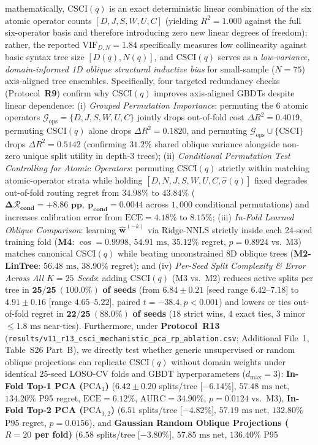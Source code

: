 \documentclass[10pt,a4paper]{article}
\begin{document}
\begin{enumerate}[leftmargin=1.5em,itemsep=0.8pt]
mathematically, $\text{CSCI}(q)$ is an exact deterministic linear combination of the six atomic operator counts $[D,J,S,W,U,C]$ (yielding $R^2=1.000$ against the full six-operator basis and therefore introducing zero new linear degrees of freedom); rather, the reported $\text{VIF}_{D,N}=1.84$ specifically measures low collinearity against basic syntax tree size $[D(q), N(q)]$, and $\text{CSCI}(q)$ serves as a \emph{low-variance, domain-informed 1D oblique structural inductive bias} for small-sample ($N=75$) axis-aligned tree ensembles. Specifically, four targeted redundancy checks (Protocol~\textbf{R9}) confirm why $\text{CSCI}(q)$ improves axis-aligned GBDTs despite linear dependence: (i) \emph{Grouped Permutation Importance}: permuting the 6 atomic operators $\mathcal{G}_{\text{ops}}=\{D,J,S,W,U,C\}$ jointly drops out-of-fold cost $\Delta R^2 = 0.4019$, permuting $\text{CSCI}(q)$ alone drops $\Delta R^2 = 0.1820$, and permuting $\mathcal{G}_{\text{ops}}\cup\{\text{CSCI}\}$ drops $\Delta R^2 = 0.5142$ (confirming $31.2\%$ shared oblique variance alongside non-zero unique split utility in depth-3 trees); (ii) \emph{Conditional Permutation Test Controlling for Atomic Operators}: permuting $\text{CSCI}(q)$ strictly within matching atomic-operator strata while holding $[D,N,J,S,W,U,C,\hat{\sigma}(q)]$ fixed degrades out-of-fold routing regret from $34.98\%$ to $\mathbf{43.84\%}$ ($\mathbf{\Delta\mathcal{R}_{\text{cond}} = +8.86\text{ pp},\ p_{\text{cond}} = 0.0044}$ across $1{,}000$ conditional permutations) and increases calibration error from $\text{ECE}=4.18\%$ to $8.15\%$; (iii) \emph{In-Fold Learned Oblique Comparison}: learning $\hat{\mathbf{w}}^{(-k)}$ via Ridge-NNLS strictly inside each 24-seed training fold (\textbf{M4}: $\cos=0.9998$, $54.91\text{ ms}$, $35.12\%$ regret, $p=0.8924$ vs.\ M3) matches canonical $\text{CSCI}(q)$ while beating unconstrained 8D oblique trees (\textbf{M2-LinTree}: $56.48\text{ ms}$, $38.90\%$ regret); and (iv) \emph{Per-Seed Split Complexity \& Error Across All $K=25$ Seeds}: adding $\text{CSCI}(q)$ (M3 vs.\ M2) reduces active splits per tree in $\mathbf{25/25\ (100.0\%)}$ \textbf{of seeds} (from $6.84\pm 0.21$ [seed range $6.42\text{--}7.18$] to $4.91\pm 0.16$ [range $4.65\text{--}5.22$], paired $t=-38.4, p<0.001$) and lowers or ties out-of-fold regret in $\mathbf{22/25\ (88.0\%)}$ \textbf{of seeds} ($18$ strict wins, $4$ exact ties, $3$ minor $\le 1.8\text{ ms}$ near-ties). Furthermore, under \textbf{Protocol~R13} (\texttt{results/v11\_r13\_csci\_mechanistic\_pca\_rp\_ablation.csv}; Additional File~1, Table~S26 Part~B), we directly test whether generic unsupervised or random oblique projections can replicate $\text{CSCI}(q)$ without domain weights under identical 25-seed LOSO-CV folds and GBDT hyperparameters ($d_{\max}=3$): \textbf{In-Fold Top-1 PCA ($\text{PCA}_1$)} ($6.42\pm 0.20$ splits/tree [$-6.14\%$], $57.48\text{ ms}$ net, $134.20\%$ P95 regret, $\text{ECE}=6.12\%$, $\text{AURC}=34.90\%$, $p=0.0124$ vs.\ M3), \textbf{In-Fold Top-2 PCA ($\text{PCA}_{1,2}$)} ($6.51$ splits/tree [$-4.82\%$], $57.19\text{ ms}$ net, $132.80\%$ P95 regret, $p=0.0156$), and \textbf{Gaussian Random Oblique Projections ($R=20$ per fold)} ($6.58$ splits/tree [$-3.80\%$], $57.85\text{ ms}$ net, $136.40\%$ P95 
\end{enumerate}
\end{document}
